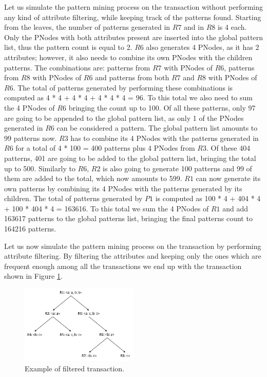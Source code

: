 \documentclass{acm_proc_article-sp-sigmod09}
\begin{document}
Let us simulate the pattern mining process on the transaction without performing any kind of attribute filtering, while keeping track of the patterns found. Starting from the leaves, the number of patterns generated in $R7$ and in $R8$ is 4 each. Only the PNodes with both attributes present are inserted into the global pattern list, thus the pattern count is equal to 2. $R6$ also generates 4 PNodes, as it has 2 attributes; however, it also needs to combine its own PNodes with the children patterns. The combinations are: patterns from $R7$ with PNodes of $R6$, patterns from $R8$ with PNodes of $R6$ and patterns from both $R7$ and $R8$ with PNodes of $R6$. The total of patterns generated by performing these combinations is computed as 4 * 4 + 4 * 4 + 4 * 4 * 4 = 96. To this total we also need to sum the 4 PNodes of $R6$ bringing the count up to 100. Of all these patterns, only 97 are going to be appended to the global pattern list, as only 1 of the PNodes generated in $R6$ can be considered a pattern. The global pattern list amounts to 99 patterns now. $R3$ has to combine its 4 PNodes with the patterns generated in $R6$ for a total of 4 * 100 = 400 patterns plus 4 PNodes from $R3$. Of these 404 patterns, 401 are going to be added to the global pattern list, bringing the total up to 500. Similarly to $R6$, $R2$ is also going to generate 100 patterns and 99 of them are added to the total, which now amounts to 599. $R1$ can now generate its own patterns by combining its 4 PNodes with the patterns generated by its children. The total of patterns generated by $P1$ is computed as 100 * 4 + 404 * 4 + 100 * 404 * 4 = 163616. To this total we sum the 4 PNodes of $R1$ and add 163617 patterns to the global patterns list, bringing the final patterns count to 164216 patterns.

Let us now simulate the pattern mining process on the transaction by performing attribute filtering. By filtering the attributes and keeping only the ones which are frequent enough among all the transactions we end up with the transaction shown in Figure \ref{fig:transactionTrimmedComplexity}.

\begin{figure}[h!]
\centering
\includegraphics[width=0.5\textwidth]{TrimmedTransactionExample.jpg}
\caption{Example of filtered transaction.}
\label{fig:transactionTrimmedComplexity}
\end{figure}
\end{document}
